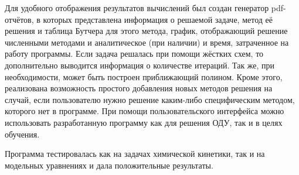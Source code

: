 Для удобного отображения результатов вычислений был создан генератор pdf-отчётов, в которых представлена информация о решаемой
задаче, метод её решения и таблица Бутчера для этого метода, график, отображающий решение численными методами и аналитическое
(при наличии) и время, затраченное на работу программы. Если задача решалась при помощи жёстких схем, то дополнительно выводится
информация о количестве итераций. Так же, при необходимости, может быть построен приближающий полином. Кроме этого, реализована
возможность простого добавления новых методов решения на случай, если пользователю нужно решение каким-либо специфическим методом,
которого нет в программе. При помощи пользовательского интерфейса можно использовать разработанную программу как для решения ОДУ, так
и в целях обучения.

Программа тестировалась как на задачах химической кинетики, так и на модельных уравнениях и дала положительные результаты.